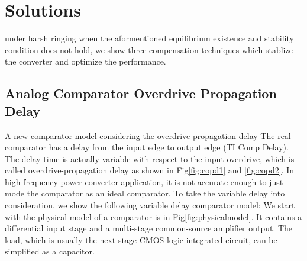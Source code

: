 \section{Solutions} \label{sec:solution}

under harsh ringing when the aformentioned equilibrium existence and stability condition does not hold, we show three compensation techniques which stablize the converter and optimize the performance.

\subsection{Analog Comparator Overdrive Propagation Delay}

A new comparator model considering the overdrive propagation delay
The real comparator has a delay from the input edge to output edge (TI Comp Delay). The delay time is actually variable with respect to the input overdrive, which is called overdrive-propagation delay as shown in Fig\;\ref{fig:copd1} and \ref{fig:copd2}. In high-frequency power converter application, it is not accurate enough to just mode the comparator as an ideal comparator. To take the variable delay into consideration, we show the following variable delay comparator model: We start with the physical model of a comparator is in Fig\;\ref{fig:physicalmodel}. It contains a differential input stage and a multi-stage common-source amplifier output. The load, which is usually the next stage CMOS logic integrated circuit, can be simplified as a capacitor. 
